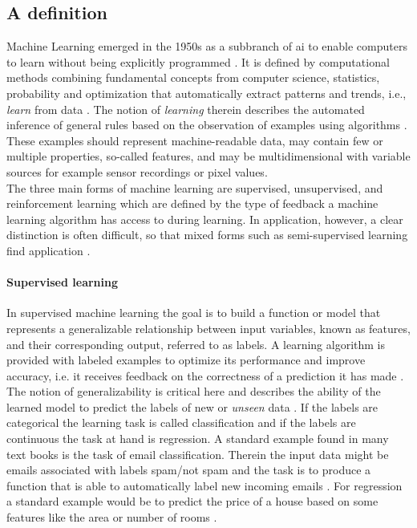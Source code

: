 
\subsection{A definition}
Machine Learning emerged in the 1950s as a subbranch of \gls{ai} to enable computers to learn without being explicitly programmed \cite{Samual1959}. It is defined by computational methods combining fundamental concepts from computer science, statistics, probability and optimization that automatically extract patterns and trends, i.e., \textit{learn} from data \cite{Hastie2009}. The notion of \textit{learning} therein describes the automated inference of general rules based on the observation of examples using algorithms \cite{Von_luxburg2011}. These examples should represent machine-readable data, may contain few or multiple properties, so-called features, and may be multidimensional with variable sources for example sensor recordings or pixel values.\\
The three main forms of machine learning are supervised, unsupervised, and reinforcement learning which are defined by the type of feedback a machine learning algorithm has access to during learning. In application, however, a clear distinction is often difficult, so that mixed forms such as semi-supervised learning find application \cite{Russell2015}. 

\paragraph{Supervised learning}
In supervised machine learning the goal is to build a function or model that represents a generalizable relationship between input variables, known as features, and their corresponding output, referred to as labels. A learning algorithm is provided with labeled examples to optimize its performance and improve accuracy, i.e. it receives feedback on the correctness of a prediction it has made \cite{Russell2015}. The notion of generalizability is critical here and describes the ability of the learned model to predict the labels of new or \textit{unseen} data \cite{Daumé2017}. If the labels are categorical the learning task is called classification and if the labels are continuous the task at hand is regression. A standard example found in many text books is the task of email classification. Therein the input data might be emails associated with labels spam/not spam and the task is to produce a function that is able to automatically label new incoming emails \cite{Shalev2014}. For regression a standard example would be to predict the price of a house based on some features like the area or number of rooms \cite{Ng2022cs229notes}.


